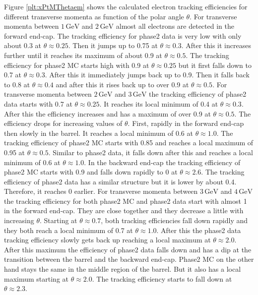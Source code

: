 \documentclass[a4paper,11pt,twosided,final,german,openbib,pdftex,listof=totoc,bibliography=totoc]{scrbook}
\begin{document}
Figure \ref{plt:xPtMThetaem} shows the calculated electron tracking efficiencies for different transverse momenta as function of the polar angle $\theta$. For transverse momenta between $1\,\textrm{GeV}$ and $2\,\textrm{GeV}$ almost all electrons are detected in the forward end-cap.  The tracking efficiency for phase2 data is very low with only about 0.3 at $\theta \approx 0.25$. Then it jumps up to 0.75 at $\theta \approx 0.3$. After this it increases further until it reaches its maximum of about 0.9 at $\theta \approx 0.5$. The tracking efficiency for phase2 MC starts high with 0.9 at $\theta \approx 0.25$ but it first falls down to 0.7 at $\theta \approx 0.3$. After this it immediately jumps back up to 0.9. Then it falls back to 0.8 at $\theta \approx 0.4$ and after this it rises back up to over 0.9 at $\theta \approx 0.5$.
For transverse momenta between $2\,\textrm{GeV}$ and $3\,\textrm{GeV}$ the tracking efficiency of phase2 data starts with 0.7 at $\theta \approx 0.25$. It reaches its local minimum of 0.4 at $\theta \approx 0.3$. After this the efficiency increases and has a maximum of over 0.9 at $\theta \approx 0.5$. The efficiency drops for increasing values of $\theta$. First, rapidly in the forward end-cap then slowly in the barrel. It reaches a local minimum of 0.6 at $\theta \approx 1.0$. The tracking efficiency of phase2 MC starts with 0.85 and reaches a local maximum of 0.95 at $\theta \approx 0.5$. Similar to phase2 data, it falls down after this and reaches a local minimum of 0.6 at $\theta \approx 1.0$. In the backward end-cap the tracking efficiency of phase2 MC starts with 0.9 and falls down rapidly to 0 at $\theta \approx 2.6$. The tracking efficiency of phase2 data has a similar structure but it is lower by about 0.4. Therefore, it reaches 0 earlier.
For transverse momenta between $3\,\textrm{GeV}$ and $4\,\textrm{GeV}$ the tracking efficiency for both phase2 MC and phase2 data start with almost 1 in the forward end-cap. They are close together and they decrease a little with increasing $\theta$. Starting at $\theta \approx 0.7$, both tracking efficiencies fall down rapidly and they both reach a local minimum of 0.7 at $\theta \approx 1.0$. After this the phase2 data tracking efficiency slowly gets back up reaching a local maximum at $\theta \approx 2.0$. After this maximum the efficiency of phase2 data falls down and has a dip at the transition between the barrel and the backward end-cap. Phase2 MC on the other hand stays the same in the middle region of the barrel. But it also has a local maximum starting at $\theta \approx 2.0$. The tracking efficiency starts to fall down at $\theta \approx 2.3$.
\end{document}
